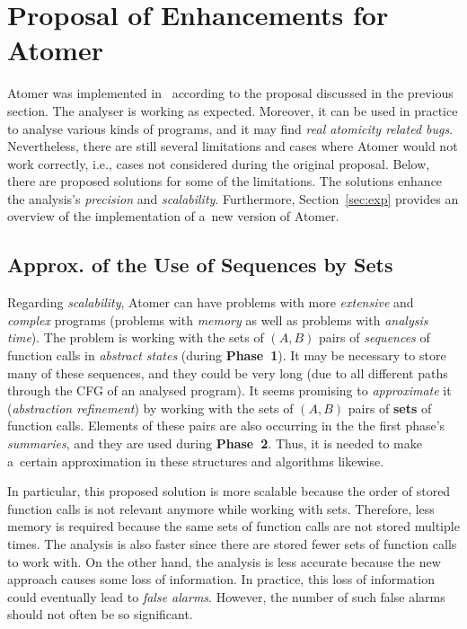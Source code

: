\documentclass{ExcelAtFIT}
\theoremstyle{definition}
\begin{document}
\section{\hspace{-.15em}Proposal of Enhancements for Atomer}
\label{sec:proposal}

Atomer was implemented in~\cite{harmimBP} according to the proposal discussed in the previous section. The analyser is working as expected. Moreover, it can be used in practice to analyse various kinds of programs, and it may find \emph{real atomicity related bugs}. Nevertheless, there are still several limitations and cases where Atomer would not work correctly, i.e., cases not considered during the original proposal. Below, there are proposed solutions for some of the limitations. The solutions enhance the analysis's \emph{precision} and \emph{scalability}. Furthermore, Section~\ref{sec:exp} provides an overview of the implementation of a~new version of Atomer.

\subsection{Approx. of the Use of Sequences by Sets}

Regarding \emph{scalability}, Atomer can have problems with more \emph{extensive} and \emph{complex} programs (problems with \emph{memory} as well as problems with \emph{analysis time}). The problem is working with the sets of ${ (A, B) }$ pairs of \emph{sequences} of function calls in \emph{abstract states} (during \textbf{Phase~1}). It may be necessary to store many of these sequences, and they could be very long (due to all different paths through the CFG of an analysed program). It seems promising to \emph{approximate} it (\emph{abstraction refinement}) by working with the sets of ${ (A, B) }$ pairs of \textbf{sets} of function calls. Elements of these pairs are also occurring in the the first phase's \emph{summaries}, and they are used during \textbf{Phase~2}. Thus, it is needed to make a~certain approximation in these structures and algorithms likewise.

In particular, this proposed solution is more scalable because the order of stored function calls is not relevant anymore while working with sets. Therefore, less memory is required because the same sets of function calls are not stored multiple times. The analysis is also faster since there are stored fewer sets of function calls to work with. On the other hand, the analysis is less accurate because the new approach causes some loss of information. In practice, this loss of information could eventually lead to \emph{false alarms}. However, the number of such false alarms should not often be so significant.
\end{document}
